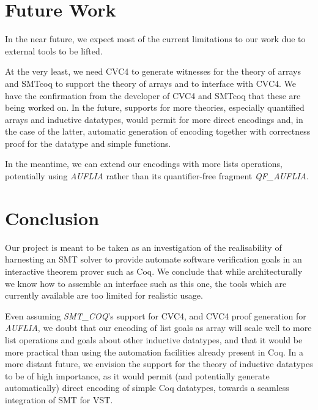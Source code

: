\documentclass[onecolumn, preprint]{sigplanconf}
\begin{document}


\section{Future Work}
In the near future, we expect most of the current limitations to our work due to external tools to be lifted.

At the very least, we need CVC4 to generate witnesses for the theory of arrays and SMTcoq to support the theory of arrays and to interface with CVC4. We have the confirmation from the developer of CVC4 and SMTcoq that these are being worked on. In the future, supports for more theories, especially quantified arrays and inductive datatypes, would permit for more direct encodings and, in the case of the latter, automatic generation of encoding together with correctness proof for the datatype and simple functions.

In the meantime, we can extend our encodings with more lists operations, potentially using \emph{AUFLIA} rather than its quantifier-free fragment \emph{QF\_AUFLIA}.

\section{Conclusion}
Our project is meant to be taken as an investigation of the realisability of harnesting an SMT solver to provide automate software verification goals in an interactive theorem prover such as Coq. We conclude that while architecturally we know how to assemble an interface such as this one, the tools which are currently available are too limited for realistic usage.




Even assuming \emph{SMT\_COQ}'s support for CVC4, and CVC4 proof generation for \emph{AUFLIA}, we doubt that our encoding of list goals as array will scale well to more list operations and goals about other inductive datatypes, and that it would be more practical than using the automation facilities already present in Coq. In a more distant future, we envision the support for the theory of inductive datatypes to be of high importance, as it would permit (and potentially generate automatically)  direct encoding of simple Coq datatypes, towards a seamless integration of SMT for VST.
\end{document}
